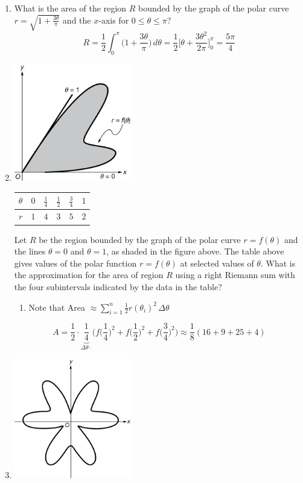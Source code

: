 \documentclass[12pt]{article}
\begin{document}
\begin{enumerate}
	\item What is the area of the region $R$ bounded by the graph of the polar curve $r=\sqrt{1+\frac{3\theta}{\pi}}$ and the $x$-axis for $0\leq\theta\leq\pi$?
	      $$R = \frac{1}{2} \int_{0}^{\pi} \bigg(1+\frac{3\theta}{\pi}\bigg) \, d\theta = \frac{1}{2} \bigg[\theta + \frac{3\theta^2}{2\pi}\bigg]_{0}^{\pi} = \boxed{\frac{5\pi}{4}}$$
	\item 
	      \begin{center}
	      	\includegraphics[width = 2in]{7.035}
	      \end{center}
	      \begin{table}[h]
	      	\centering
	      	\begin{tabular}{c|c|c|c|c|c}
	      		$\theta$ & $0$ & $\frac{1}{4}$ & $\frac{1}{2}$ & $\frac{3}{4}$ & $1$ \\ \hline
	      		$r$      & $1$ & $4$           & $3$           & $5$           & $2$ 
	      	\end{tabular}
	      \end{table}
	      Let $R$ be the region bounded by the graph of the polar curve $r=f(\theta)$ and the lines $\theta=0$ and $\theta=1$, as shaded in the figure above. The table above gives values of the polar function $r=f(\theta)$ at selected values of $\theta$. What is the approximation for the area of region $R$ using a right Riemann sum with the four subintervals indicated by the data in the table?
	      \begin{enumerate}
	      	\item Note that Area $\approx \sum_{i=1}^{n} \frac{1}{2} r(\theta_i)^2 \, \Delta \theta$
	      \end{enumerate}
	      $$A = \frac{1}{2}\cdot \underbrace{\frac{1}{4}}_{\Delta\theta \cdot}\biggr(f\Big(\frac{1}{4}\Big)^2+f\Big(\frac{1}{2}\Big)^2 + f\Big(\frac{3}{4}\Big)^2\biggr) \approx \boxed{\frac{1}{8}(16+9+25+4)}$$
	\item 
	      \begin{center}
	      	\includegraphics[width = 2in]{7.036}

\end{center}
\end{enumerate}
\end{document}
